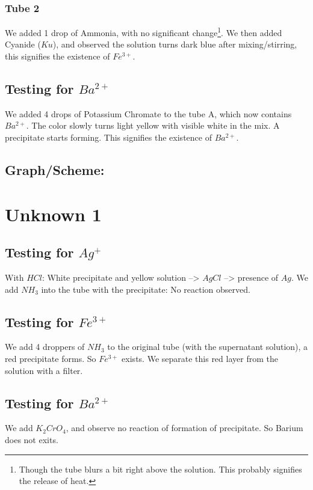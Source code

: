 \documentclass[11pt]{article}
\begin{document}
\subsubsection{Tube 2}
\label{sec:org907daeb}
We added 1 drop of Ammonia, with no significant change\footnote{Though the tube blurs a bit right above the solution. This probably signifies the release of heat.}.
We then added Cyanide (\(Ku\)), and observed the solution turns dark blue after mixing/stirring, this signifies the existence of \(Fe^{3+}\).
\subsection{Testing for \(Ba^{2+}\)}
\label{sec:org1ea1dab}
We added 4 drops of Potassium Chromate to the tube A, which now contains \(Ba^{2+}\). The color slowly turns light yellow with visible white in the mix. A precipitate starts forming. This signifies the existence of \(Ba^{2+}\).
\subsection{Graph/Scheme:}
\label{sec:org9a03ddc}
\begin{center}
  \makebox[0pt]{ \scalebox{0.85}{  } }
\end{center}
%   
\section{Unknown 1}
\label{sec:org4bc42f6}
\subsection{Testing for \(Ag^+\)}
\label{sec:org82ebfb8}
With \(HCl\): White precipitate and yellow solution --> \(AgCl\) --> presence of \(Ag\).
We add \(NH_3\) into the tube with the precipitate: No reaction observed.
\subsection{Testing for \(Fe^{3+}\)}
\label{sec:org6b42058}
We add 4 droppers of \(NH_3\) to the original tube (with the supernatant solution), a red precipitate forms. So \(Fe^{3+}\) exists. We separate this red layer from the solution with a filter.
\subsection{Testing for \(Ba^{2+}\)}
\label{sec:orgc9adc99}
We add \(K_2CrO_4\), and observe no reaction of formation of precipitate. So Barium does not exits.
\end{document}
